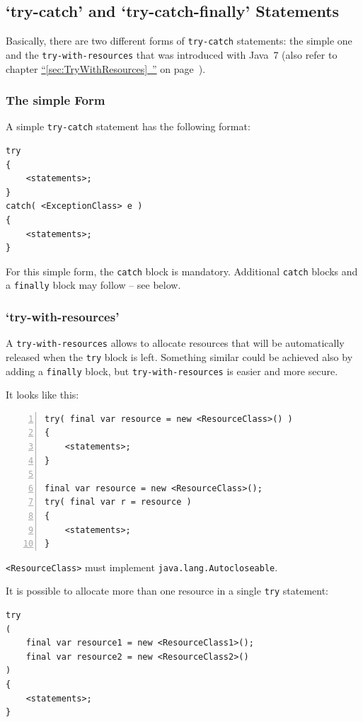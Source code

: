 \documentclass[11pt,a4paper, titlepage, parskip=half, headsepline, footsepline, cleardoublepage=current, headheight=1cm]{scrbook}
\newcommand*{\tqfullvref}[1]{\hyperref[{#1}]{“\ref*{#1}~\nameref*{#1}”} on page~\pageref{#1}}
\begin{document}

\subsection{‘try-catch’ and ‘try-catch-finally’ Statements}
Basically, there are two different forms of \lstinline|try-catch| statements: the simple one and the \lstinline|try-with-resources| that was introduced with Java~7 (also refer to chapter \tqfullvref{sec:TryWithResources}).

\subsubsection{The simple Form}
A simple \lstinline|try-catch| statement has the following format:
\begin{lstlisting}
try
{
    <statements>;
}
catch( <ExceptionClass> e )
{
    <statements>;
}
\end{lstlisting}
For this simple form, the \lstinline|catch| block is mandatory. Additional \lstinline|catch| blocks and a \lstinline|finally| block may follow – see below.

\subsubsection{‘try-with-resources’}
A \lstinline|try-with-resources| allows to allocate resources that will be automatically released when the \lstinline|try| block is left. Something similar could be achieved also by adding a \lstinline|finally| block, but \lstinline|try-with-resources| is easier and more secure.

It looks like this:
\begin{lstlisting}[numbers=left]
try( final var resource = new <ResourceClass>() )
{
    <statements>;
}

final var resource = new <ResourceClass>();
try( final var r = resource )
{
    <statements>;
}
\end{lstlisting}

\lstinline|<ResourceClass>| must implement \lstinline|java.lang.Autocloseable|.

It is possible to allocate more than one resource in a single \lstinline|try| statement:
\begin{lstlisting}
try
( 
    final var resource1 = new <ResourceClass1>(); 
    final var resource2 = new <ResourceClass2>() 
)
{
    <statements>;
}
\end{lstlisting}
\end{document}
